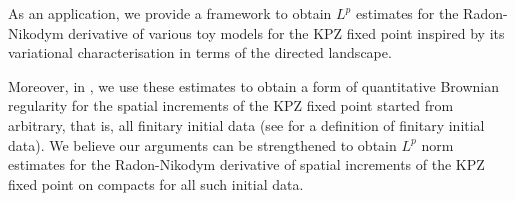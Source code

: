\documentclass[11pt, reqno]{amsart}
\numberwithin{equation}{section}
\newcounter{dummy} \numberwithin{dummy}{section}
\newtheorem{theorem}[dummy]{Theorem}
\newcommand{\F}{\mathcal{F}}
\begin{document}
As an application, we provide a framework to obtain $L^p$ estimates for the Radon-Nikodym derivative of various toy models for the KPZ fixed point inspired by its variational characterisation in terms of the directed landscape. 

Moreover, in \cite[Theorem 6.6]{tassopoulos2025quantitativebrownianregularitykpz}, we use these estimates to obtain a form of quantitative Brownian regularity for the spatial increments of the KPZ fixed point started from arbitrary, that is, all finitary initial data (see \cite{Sarkar2021Brownian} for a definition of finitary initial data). We believe our arguments can be strengthened to obtain $L^p$ norm estimates for the Radon-Nikodym derivative of spatial increments of the KPZ fixed point on compacts for all such initial data.

\end{document}
